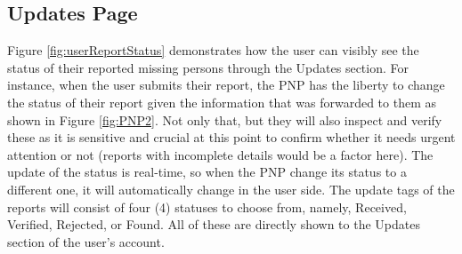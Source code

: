 \subsection{Updates Page}

Figure \ref{fig:userReportStatus} demonstrates how the user can visibly see the status of their reported missing persons through the Updates section. For instance, when the user submits their report, the PNP has the liberty to change the status of their report given the information that was forwarded to them as shown in Figure \ref{fig:PNP2}. Not only that, but they will also inspect and verify these as it is sensitive and crucial at this point to confirm whether it needs urgent attention or not (reports with incomplete details would be a factor here). The update of the status is real-time, so when the PNP change its status to a different one, it will automatically change in the user side. The update tags of the reports will consist of four (4) statuses to choose from, namely, Received, Verified, Rejected, or Found. All of these are directly shown to the Updates section of the user's account.

